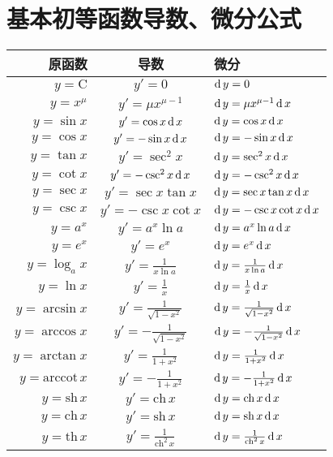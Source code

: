 \section{基本初等函数导数、微分公式}
  \begin{center}
    \begin{tabular}{r @{\qquad} c @{\qquad} l}
    \toprule[1pt]
      原函数 & 导数 & 微分\\
    \midrule[0.5pt]
      $y=\mathrm{C}$ & $y' = 0$ & $\rd y = 0$\\
      $y=x^\mu$ & $y' = \mu x^{\mu - 1}$ & $\rd y = \mu x^{\mu - 1} \rd x$\\
      $y = \sin x$ & $y' = \cos x \rd x$ & $\rd y = \cos x \rd x$\\
      $y = \cos x$ & $y' = - \sin x \rd x$ & $\rd y = - \sin x \rd x$\\
      $y = \tan x$ & $y' = \sec ^2 x$ & $\rd y = \sec ^2 x \rd x$\\
      $y = \cot x$ & $y' = - \csc ^2 x \rd x$ & $\rd y = - \csc ^2 x \rd x$\\
      $y = \sec x$ & $y' = \sec x \tan x$ & $\rd y = \sec x \tan x \rd x$\\
      $y = \csc x$ & $y' = -\csc x \cot x$ & $\rd y = -\csc x \cot x \rd x$\\
      $y = a^x$ & $y' = a^x \ln a$ & $\rd y = a^x \ln a \rd x$\\
      $y = e^x$ & $y' = e^x$ & $\rd y = e^x \rd x$\\
      $y = \log_a x$ & $y' = \frac{1}{x \ln a}$ & $\rd y = \frac{1}{x \ln a} \rd x$\\
      $y = \ln x$ & $y' = \frac{1}{x}$ & $\rd y = \frac{1}{x} \rd x$\\
      $y = \arcsin x$ & $y' = \frac{1}{\sqrt{1-x^2}}$ & $\rd y = \frac{1}{\sqrt{1-x^2}} \rd x$\\
      $y = \arccos x$ & $y' = - \frac{1}{\sqrt{1-x^2}}$ & $\rd y = - \frac{1}{\sqrt{1-x^2}} \rd x$\\
      $y = \arctan x$ & $y' = \frac{1}{1+x^2}$ & $\rd y = \frac{1}{1+x^2} \rd x$\\
      $y = \mathrm{arccot\,} x$ & $y' = - \frac{1}{1+x^2}$ & $\rd y = - \frac{1}{1+x^2} \rd x$\\
      $y = \mathrm{sh\,}x$ & $y' = \mathrm{ch\,} x$ & $\rd y = \mathrm{ch\,} x \rd x$\\
      $y = \mathrm{ch\,}x$ & $y' = \mathrm{sh\,} x$ & $\rd y = \mathrm{sh\,} x \rd x$\\
      $y = \mathrm{th\,} x$ & $y' = \frac{1}{\mathrm{ch}^2 \,x}$ & $\rd y = \frac{1}{\mathrm{ch}^2 \,x} \rd x $\\
    \bottomrule[1pt]
    \end{tabular}
  \end{center}

